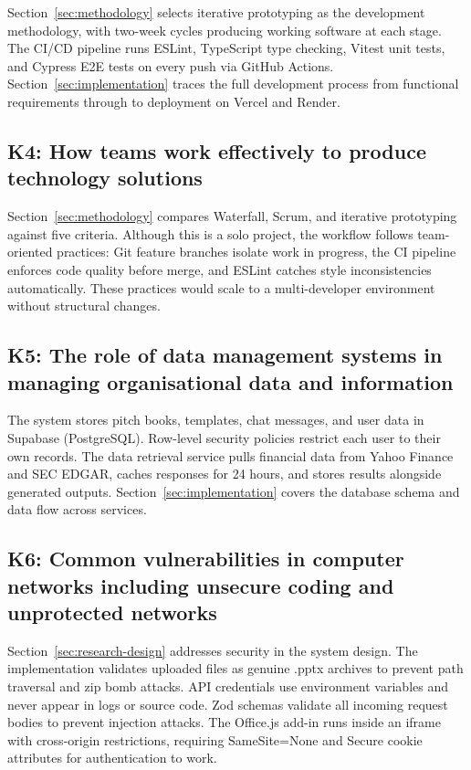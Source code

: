 Section~\ref{sec:methodology} selects iterative prototyping as the development methodology, with two-week cycles producing working software at each stage. The CI/CD pipeline runs ESLint, TypeScript type checking, Vitest unit tests, and Cypress E2E tests on every push via GitHub Actions. Section~\ref{sec:implementation} traces the full development process from functional requirements through to deployment on Vercel and Render.

\subsection*{K4: How teams work effectively to produce technology solutions}

Section~\ref{sec:methodology} compares Waterfall, Scrum, and iterative prototyping against five criteria. Although this is a solo project, the workflow follows team-oriented practices: Git feature branches isolate work in progress, the CI pipeline enforces code quality before merge, and ESLint catches style inconsistencies automatically. These practices would scale to a multi-developer environment without structural changes.

\subsection*{K5: The role of data management systems in managing organisational data and information}

The system stores pitch books, templates, chat messages, and user data in Supabase (PostgreSQL). Row-level security policies restrict each user to their own records. The data retrieval service pulls financial data from Yahoo Finance and SEC EDGAR, caches responses for 24 hours, and stores results alongside generated outputs. Section~\ref{sec:implementation} covers the database schema and data flow across services.

\subsection*{K6: Common vulnerabilities in computer networks including unsecure coding and unprotected networks}

Section~\ref{sec:research-design} addresses security in the system design. The implementation validates uploaded files as genuine .pptx archives to prevent path traversal and zip bomb attacks. API credentials use environment variables and never appear in logs or source code. Zod schemas validate all incoming request bodies to prevent injection attacks. The Office.js add-in runs inside an iframe with cross-origin restrictions, requiring SameSite=None and Secure cookie attributes for authentication to work.

